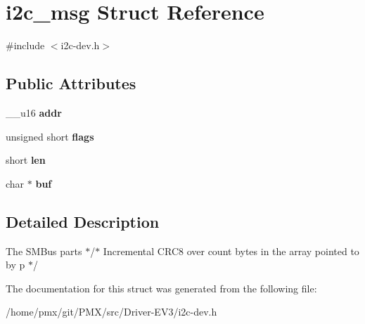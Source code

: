 \hypertarget{structi2c__msg}{}\section{i2c\+\_\+msg Struct Reference}
\label{structi2c__msg}


{\ttfamily \#include $<$i2c-\/dev.\+h$>$}

\subsection*{Public Attributes}
\begin{DoxyCompactItemize}
\item 
\mbox{\label{structi2c__msg_a9be257e05859e69552791192b68a8654}} 
\+\_\+\+\_\+u16 {\bfseries addr}
\item 
\mbox{\label{structi2c__msg_a4b3bc1a36147fedfbdf9a15cc6ae88d9}} 
unsigned short {\bfseries flags}
\item 
\mbox{\label{structi2c__msg_a10d1943df9a527109bf60733baf7b0a4}} 
short {\bfseries len}
\item 
\mbox{\label{structi2c__msg_a18a0ec0f4f45577ea2b751b984b00762}} 
char $\ast$ {\bfseries buf}
\end{DoxyCompactItemize}


\subsection{Detailed Description}

\begin{DoxyItemize}
\item The S\+M\+Bus parts $\ast$/$\ast$ Incremental C\+R\+C8 over count bytes in the array pointed to by p $\ast$/ 
\end{DoxyItemize}

The documentation for this struct was generated from the following file\+:\begin{DoxyCompactItemize}
\item 
/home/pmx/git/\+P\+M\+X/src/\+Driver-\/\+E\+V3/i2c-\/dev.\+h\end{DoxyCompactItemize}
